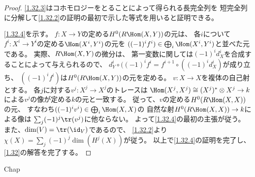 \documentclass[uplatex,dvipdfmx]{jsarticle}
\begin{document}
\begin{proof}
  \ref{1.32.3}はコホモロジーをとることによって得られる長完全列を
  短完全列に分解して\ref{1.32.2}の証明の最初で示した等式を用いると証明できる。

  \ref{1.32.4}を示す。
  \(f:X\to Y\)の定める\(H^0(R\Hom(X,Y))\)の元は、
  各\(i\)について\(f^i:X^i\to Y^i\)の定める\(\Hom(X^i,Y^i)\)の元を
  \(((-1)^if^i)\in \bigoplus_i \Hom(X^i,Y^i)\)と並べた元である。
  実際、\(R\Hom(X,Y)\)の微分は、
  第一変数に関しては\((-1)^id_X^i\)を合成することによって与えられるので、
  \(d_Y^i\circ ((-1)^if^i = f^{i+1}\circ ((-1)^id_X^i)\)が成り立ち、
  \(((-1)^if^i)\)は\(H^0(R\Hom(X,Y))\)の元を定める。
  \(v:X\to X\)を複体の自己射とする。
  各\(j\)に対する\(v^j:X^j \to X^j\)のトレースは
  \(\Hom(X^j,X^j) \cong (X^j)^*\otimes X^j \to k\)
  による\(v^j\)の像が定める\(k\)の元と一致する。
  従って、\(v\)の定める\(H^0(R\Hom(X,X))\)の元、
  すなわち\(((-1)^iv^i)\in \bigoplus_i \Hom(X,X)\)の
  自然な射\(H^0(R\Hom(X,X))\to k\)による像は
  \(\sum_j(-1)^j\tr(v^j)\)に他ならない。
  よって\ref{1.32.4}の最初の主張が従う。
  また、\(\dim(V) = \tr(\id_V)\)であるので、
  \ref{1.32.2}より
  \(\chi(X) = \sum_j(-1)^j\dim(H^j(X))\)が従う。
  以上で\ref{1.32.4}の証明を完了し、
  \autoref{1.32}の解答を完了する。
\end{proof}



\ifcsname Chap\endcsname\else
\printbibliography
\end{document}
